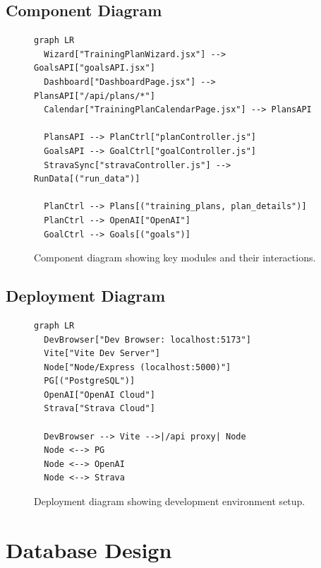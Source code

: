 \subsection*{Component Diagram}
\begin{figure}[h]
\centering
\begin{minipage}{0.95\linewidth}
\begin{verbatim}
graph LR
  Wizard["TrainingPlanWizard.jsx"] --> GoalsAPI["goalsAPI.jsx"]
  Dashboard["DashboardPage.jsx"] --> PlansAPI["/api/plans/*"]
  Calendar["TrainingPlanCalendarPage.jsx"] --> PlansAPI

  PlansAPI --> PlanCtrl["planController.js"]
  GoalsAPI --> GoalCtrl["goalController.js"]
  StravaSync["stravaController.js"] --> RunData[("run_data")]

  PlanCtrl --> Plans[("training_plans, plan_details")]
  PlanCtrl --> OpenAI["OpenAI"]
  GoalCtrl --> Goals[("goals")]
\end{verbatim}
\end{minipage}
\caption{Component diagram showing key modules and their interactions.}
\end{figure}

\subsection*{Deployment Diagram}
\begin{figure}[h]
\centering
\begin{minipage}{0.95\linewidth}
\begin{verbatim}
graph LR
  DevBrowser["Dev Browser: localhost:5173"]
  Vite["Vite Dev Server"]
  Node["Node/Express (localhost:5000)"]
  PG[("PostgreSQL")]
  OpenAI["OpenAI Cloud"]
  Strava["Strava Cloud"]

  DevBrowser --> Vite -->|/api proxy| Node
  Node <--> PG
  Node <--> OpenAI
  Node <--> Strava
\end{verbatim}
\end{minipage}
\caption{Deployment diagram showing development environment setup.}
\end{figure}

\section{Database Design}

